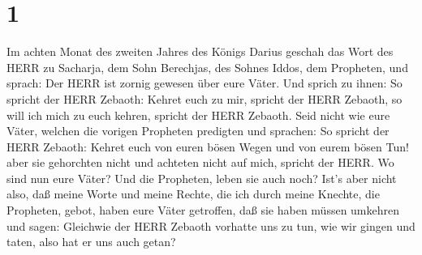 \hypertarget{section}{%
\section{1}\label{section}}

 Im achten Monat des zweiten Jahres des Königs Darius
geschah das Wort des HERR zu Sacharja, dem Sohn Berechjas, des Sohnes
Iddos, dem Propheten, und sprach:  Der HERR ist zornig
gewesen über eure Väter.  Und sprich zu ihnen: So spricht
der HERR Zebaoth: Kehret euch zu mir, spricht der HERR Zebaoth, so will
ich mich zu euch kehren, spricht der HERR Zebaoth.  Seid
nicht wie eure Väter, welchen die vorigen Propheten predigten und
sprachen: So spricht der HERR Zebaoth: Kehret euch von euren bösen Wegen
und von eurem bösen Tun! aber sie gehorchten nicht und achteten nicht
auf mich, spricht der HERR.  Wo sind nun eure Väter? Und die
Propheten, leben sie auch noch?  Ist's aber nicht also, daß
meine Worte und meine Rechte, die ich durch meine Knechte, die
Propheten, gebot, haben eure Väter getroffen, daß sie haben müssen
umkehren und sagen: Gleichwie der HERR Zebaoth vorhatte uns zu tun, wie
wir gingen und taten, also hat er uns auch getan?


